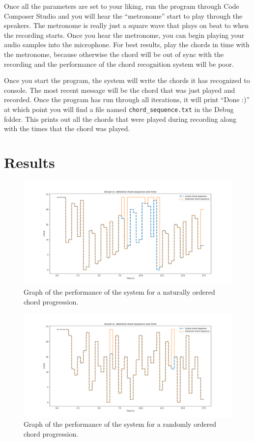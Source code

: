 \documentclass[journal]{IEEEtran}
\begin{document}
Once all the parameters are set to your liking, run the program through Code Composer Studio and you will hear the “metronome” start to play through the speakers.
The metronome is really just a square wave that plays on beat to when the recording starts.
Once you hear the metronome, you can begin playing your audio samples into the microphone.
For best results, play the chords in time with the metronome, because otherwise the chord will be out of sync with the recording and the performance of the chord recognition system will be poor.

Once you start the program, the system will write the chords it has recognized to console.
The most recent message will be the chord that was just played and recorded.
Once the program has run through all iterations, it will print ``Done :)'' at which point you will find a file named \texttt{chord\_sequence.txt} in the Debug folder.
This prints out all the chords that were played during recording along with the times that the chord was played.

\section{Results}

\begin{figure}[!t]
    \centering
    \includegraphics[width = \linewidth]{../Figures/chord_sequence_in_order}
    \caption{Graph of the performance of the system for a naturally ordered chord progression.}
    \label{fig:in_order}
\end{figure}
\begin{figure}[!t]
    \centering
    \includegraphics[width = \linewidth]{../Figures/chord_sequence_random}
    \caption{Graph of the performance of the system for a randomly ordered chord progression.}
    \label{fig:random}
\end{figure}
\end{document}
